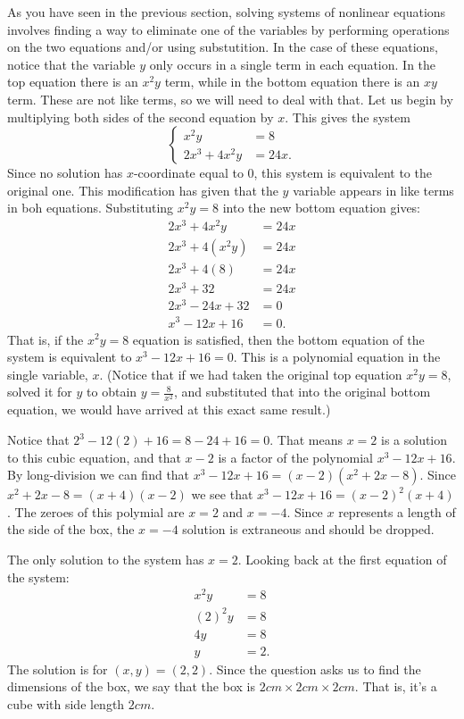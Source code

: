 \documentclass[nooutcomes]{ximera}
\begin{document}
\begin{exercise}
\begin{explanation}
			As you have seen in the previous section, solving systems of nonlinear equations involves finding a way to eliminate one of the variables by 
			performing operations on the two equations and/or using substutition. In the case of these equations, notice that the variable $y$ only occurs in a single
			term in each equation. In the top equation there is an $x^2 y$ term, while in the bottom equation there is an $xy$ term. These are not 
			like terms, so we will need to deal with that. Let us begin by multiplying both sides of the second equation by $x$. This gives the system
			$$	\begin{cases}
					x^2 y &= 8\\
					2x^3 + 4x^2y &= 24x.
				\end{cases}	$$
			Since no solution has $x$-coordinate equal to $0$, this system is equivalent to the original one. This modification has given that the $y$ variable 
			appears in like terms in boh equations. Substituting $x^2y = 8$ into the new bottom equation gives:
			\begin{align*}
				2x^3 + 4x^2 y &= 24x\\
				2x^3 + 4\left(x^2 y\right) &= 24x\\
				2x^3 + 4\left(8\right) &= 24x\\
				2x^3 + 32 &= 24x\\
				2x^3 - 24x + 32 &= 0\\
				x^3 - 12x + 16 &= 0.
			\end{align*}
			That is, if the $x^2y=8$ equation is satisfied, then the bottom equation of the system is equivalent to $x^3-12x+16=0$. This is a polynomial 
			equation in the single variable, $x$. (Notice that if we had taken the original top equation $x^2y=8$, solved it for $y$ to obtain $y=\frac{8}{x^2}$, 
			and substituted that into the original bottom equation, we would have arrived at this exact same result.)
			
			Notice that $2^3-12(2)+16 = 8 -24+16 = 0$. That means $x=2$ is a solution to this cubic equation, and that $x-2$ is a factor of the 
			polynomial $x^3-12x+16$. By long-division we can find that $x^3-12x+16 = (x-2)(x^2+2x-8)$. Since $x^2+2x-8 = (x+4)(x-2)$ we see
			that $x^3-12x+16 = (x-2)^2(x+4)$. The zeroes of this polymial are $x=2$ and $x=-4$. Since $x$ represents a length of the side of the box, 
			the $x=-4$ solution is extraneous and should be dropped.
			
			The only solution to the system has $x=2$. Looking back at the first equation of the system:
			\begin{align*}
				x^2 y &= 8\\
				(2)^2y &= 8\\
				4y &=8\\
				y &= 2.
			\end{align*}
			The solution is for $(x,y) = (2,2)$. Since the question asks us to find the dimensions of the box, we say that the box is 
			$2 cm \times 2 cm \times 2 cm$. That is, it's a cube with side length $2 cm$.
	
		\end{explanation}
	\end{exercise}	


	
\end{document}
